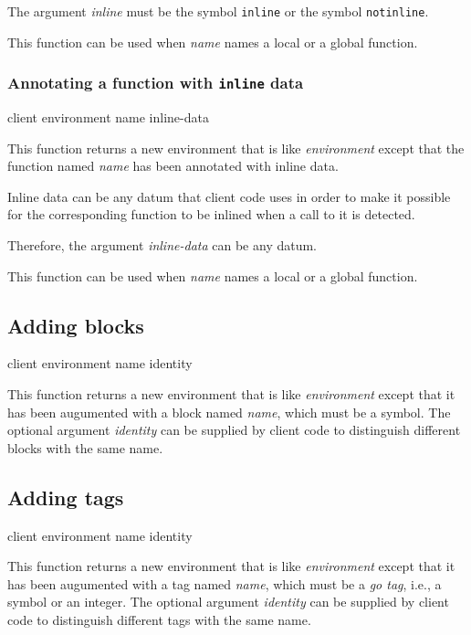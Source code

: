 The argument \textit{inline} must be the symbol \texttt{inline} or the
symbol \texttt{notinline}.

This function can be used when \textit{name} names a local or a global
function.

\subsubsection{Annotating a function with \texttt{inline} data}
\label{sec-annotating-a-function-with-inline-data}

{\footnotesize
{} {client environment name inline-data}
}

This function returns a new environment that is like
\textit{environment} except that the function named \textit{name} has
been annotated with inline data.

Inline data can be any datum that client code uses in order to make it
possible for the corresponding function to be inlined when a call to
it is detected.

Therefore, the argument \textit{inline-data} can be any datum.

This function can be used when \textit{name} names a local or a global
function.

\subsection{Adding blocks}

{\footnotesize
{} {client environment name \optional identity}
}

This function returns a new environment that is like
\textit{environment} except that it has been augumented with a block
named \textit{name}, which must be a symbol.  The optional argument
\textit{identity} can be supplied by client code to distinguish
different blocks with the same name.

\subsection{Adding tags}

{\footnotesize
{} {client environment name \optional identity}
}

This function returns a new environment that is like
\textit{environment} except that it has been augumented with a tag
named \textit{name}, which must be a \emph{go tag}, i.e., a symbol or an
integer.  The optional argument \textit{identity} can be supplied by
client code to distinguish different tags with the same name.

